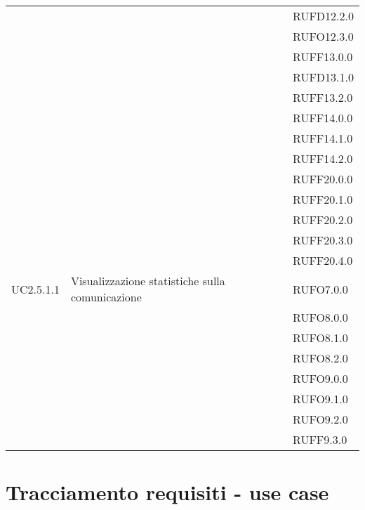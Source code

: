 \begin{center}
\begin{longtable}{lp{}l}
 &  & RUFD12.2.0 \\
 &  & RUFO12.3.0 \\
 &  & RUFF13.0.0 \\
 &  & RUFD13.1.0 \\
 &  & RUFF13.2.0 \\
 &  & RUFF14.0.0 \\
 &  & RUFF14.1.0 \\
 &  & RUFF14.2.0 \\
 &  & RUFF20.0.0 \\
 &  & RUFF20.1.0 \\
 &  & RUFF20.2.0 \\
 &  & RUFF20.3.0 \\
 &  & RUFF20.4.0 \\
UC2.5.1.1 & Visualizzazione statistiche sulla comunicazione & RUFO7.0.0 \\
 &  & RUFO8.0.0 \\
 &  & RUFO8.1.0 \\
 &  & RUFO8.2.0 \\
 &  & RUFO9.0.0 \\
 &  & RUFO9.1.0 \\
 &  & RUFO9.2.0 \\
 &  & RUFF9.3.0 \\
\bottomrule
\end{longtable}
\end{center}
\newpage\section{Tracciamento requisiti - use case}\label{sec:tracciamento}

